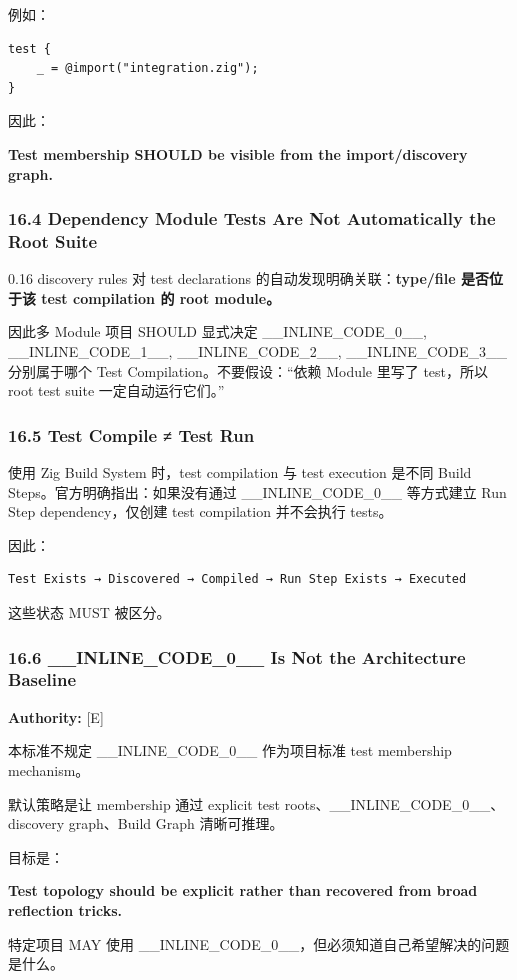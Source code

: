\documentclass[11pt,a4paper]{article}
\begin{document}
例如：

\begin{lstlisting}[language=zig]
test {
    _ = @import("integration.zig");
}
\end{lstlisting}
因此：

\begin{gfmBlockquote}
\textbf{Test membership SHOULD be visible from the import/discovery graph.}
\end{gfmBlockquote}
\subsubsection{16.4 Dependency Module Tests Are Not Automatically the Root Suite}
0.16 discovery rules 对 test declarations 的自动发现明确关联：\textbf{type/file 是否位于该 test compilation 的 root module。}

因此多 Module 项目 SHOULD 显式决定 \_\_INLINE\_CODE\_0\_\_, \_\_INLINE\_CODE\_1\_\_, \_\_INLINE\_CODE\_2\_\_, \_\_INLINE\_CODE\_3\_\_ 分别属于哪个 Test Compilation。不要假设：“依赖 Module 里写了 test，所以 root test suite 一定自动运行它们。”

\subsubsection{16.5 Test Compile ≠ Test Run}
使用 Zig Build System 时，test compilation 与 test execution 是不同 Build Steps。官方明确指出：如果没有通过 \_\_INLINE\_CODE\_0\_\_ 等方式建立 Run Step dependency，仅创建 test compilation 并不会执行 tests。

因此：

\begin{lstlisting}[language=text]
Test Exists → Discovered → Compiled → Run Step Exists → Executed
\end{lstlisting}
这些状态 MUST 被区分。

\subsubsection{16.6 \_\_INLINE\_CODE\_0\_\_ Is Not the Architecture Baseline}
\textbf{Authority:} [E]

本标准不规定 \_\_INLINE\_CODE\_0\_\_ 作为项目标准 test membership mechanism。

默认策略是让 membership 通过 explicit test roots、\_\_INLINE\_CODE\_0\_\_、discovery graph、Build Graph 清晰可推理。

目标是：

\begin{gfmBlockquote}
\textbf{Test topology should be explicit rather than recovered from broad reflection tricks.}
\end{gfmBlockquote}
特定项目 MAY 使用 \_\_INLINE\_CODE\_0\_\_，但必须知道自己希望解决的问题是什么。
\end{document}
